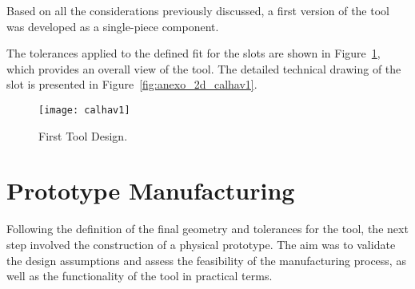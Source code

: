 Based on all the considerations previously discussed, a first version of the tool was developed as a single-piece component.

The tolerances applied to the defined fit for the slots are shown in Figure~\ref{fig:calhav1}, which provides an overall view of the tool. The detailed technical drawing of the slot is presented in Figure~\ref{fig:anexo_2d_calhav1}.

\begin{figure}[H]
\centering
\texttt{[image: calhav1]}
\caption{First Tool Design.}
\label{fig:calhav1}
\end{figure}


\section{Prototype Manufacturing}

Following the definition of the final geometry and tolerances for the tool, the next step involved the construction of a physical prototype. 
The aim was to validate the design assumptions and assess the feasibility of the manufacturing process, as well as the functionality of the tool in practical terms.











